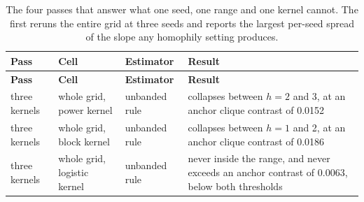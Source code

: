 \documentclass[twoside,11pt]{article}
\begin{document}
\begingroup\small
\begin{longtable}{@{}
  >{\raggedright\arraybackslash}p{}
  >{\raggedright\arraybackslash}p{}
  >{\raggedright\arraybackslash}p{}
  >{\raggedright\arraybackslash}p{}@{}}
\caption{The four passes that answer what one seed, one range and one kernel cannot. The first reruns the entire grid at three seeds and reports the largest per-seed spread of the slope any homophily setting produces.}\label{tab:5}\\
\toprule
\begin{minipage}[b]{\linewidth}\raggedright
\textbf{Pass}
\end{minipage} & \begin{minipage}[b]{\linewidth}\raggedright
\textbf{Cell}
\end{minipage} & \begin{minipage}[b]{\linewidth}\raggedright
\textbf{Estimator}
\end{minipage} & \begin{minipage}[b]{\linewidth}\raggedright
\textbf{Result}
\end{minipage} \\
\midrule
\endfirsthead
\toprule
\begin{minipage}[b]{\linewidth}\raggedright
\textbf{Pass}
\end{minipage} & \begin{minipage}[b]{\linewidth}\raggedright
\textbf{Cell}
\end{minipage} & \begin{minipage}[b]{\linewidth}\raggedright
\textbf{Estimator}
\end{minipage} & \begin{minipage}[b]{\linewidth}\raggedright
\textbf{Result}
\end{minipage} \\
\midrule
\endhead
\bottomrule
\endlastfoot
three kernels & whole grid, power kernel & unbanded rule & collapses between \(h = 2\) and 3, at an anchor clique contrast of 0.0152 \\
three kernels & whole grid, block kernel & unbanded rule & collapses between \(h = 1\) and 2, at an anchor clique contrast of 0.0186 \\
three kernels & whole grid, logistic kernel & unbanded rule & never inside the range, and never exceeds an anchor contrast of 0.0063, below both thresholds \\

\end{longtable}
\end{document}
